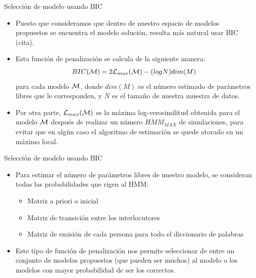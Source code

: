\begin{frame}{Selección de modelo usando BIC}
  \begin{itemize} 
    \itemsep1em

    \item Puesto que consideramos que dentro de nuestro espacio de modelos propuestos se encuentra el modelo solución, resulta más natural usar BIC (cita).

    \item Esta función de penalización se calcula de la siguiente manera: 
    \begin{equation}
    BIC(\mathcal{M}) = 2 \mathcal{L}_{max}(\mathcal{M}) - (log N ) dim(M)
    \end{equation}
    para cada modelo $\mathcal{M}$, donde $dim(M)$ es el número estimado de parámetros libres que le corresponden, y $N$ es el tamaño de nuestra muestra de datos. 

    \item Por otra parte, $\mathcal{L}_{max}(\mathcal{M})$ es la máxima log-verosimilitud obtenida para el modelo $\mathcal{M}$ después de realizar un número $HMM_{MAX}$ de simulaciones, para evitar que en algún caso el algoritmo de estimación se quede atorado en un máximo local.
  \end{itemize}
\end{frame}


\begin{frame}{Selección de modelo usando BIC}
  \begin{itemize} 
    \itemsep1em

    \item Para estimar el número de parámetros libres de nuestro modelo, se consideran todas las probabilidades que rigen al HMM:
    \begin{itemize} 
      \itemsep0.8em
      \item Matriz a priori o inicial
      \item Matriz de transición entre los interlocutores
      \item Matriz de emisión de cada persona para todo el diccionario de palabras
    \end{itemize}

    \item Este tipo de función de penalización nos permite seleccionar de entre un conjunto de modelos propuestos (que pueden ser muchos) al modelo o los modelos con mayor probabilidad de ser los correctos. 

  \end{itemize}
\end{frame}


